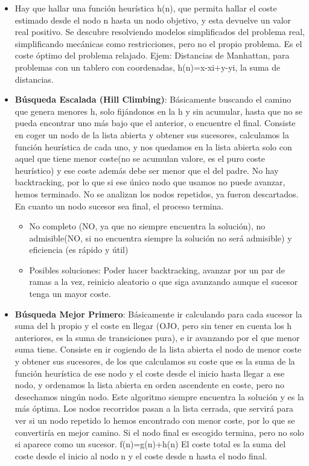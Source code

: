 \documentclass[12pt, twoside, openright]{report} %
\begin{document}
  \begin{itemize}
  \item Hay que hallar una función heurística h(n), que permita hallar el
    coste estimado desde el nodo n hasta un nodo objetivo, y esta
    devuelve un valor real positivo. Se descubre resolviendo modelos
    simplificados del problema real, simplificando mecánicas como
    restricciones, pero no el propio problema. Es el coste óptimo del
    problema relajado. Ejem: Distancias de Manhattan, para problemas con
    un tablero con coordenadas,
    h(n)=\textbar x-xi\textbar+\textbar y-yi\textbar, la suma de
    distancias.
    
  \item \textbf{Búsqueda Escalada (Hill Climbing)}: Básicamente buscando el
    camino que genera menores h, solo fijándonos en la h y sin acumular,
    hasta que no se pueda encontrar uno más bajo que el anterior, o
    encuentre el final. Consiste en coger un nodo de la lista abierta y
    obtener sus sucesores, calculamos la función heurística de cada uno,
    y nos quedamos en la lista abierta solo con aquel que tiene menor
    coste(no se acumulan valore, es el puro coste heurístico) y ese
    coste además debe ser menor que el del padre. No hay backtracking,
    por lo que si ese único nodo que usamos no puede avanzar, hemos
    terminado. No se analizan los nodos repetidos, ya fueron
    descartados. En cuanto un nodo sucesor sea final, el proceso
    termina.
    

    \begin{itemize}
    \item No completo (NO, ya que no siempre encuentra la solución), no
      admisible(NO, si no encuentra siempre la solución no será
      admisible) y eficiencia (es rápido y útil)
      
    \item Posibles soluciones: Poder hacer backtracking, avanzar por un par
      de ramas a la vez, reinicio aleatorio o que siga avanzando aunque
      el sucesor tenga un mayor coste.
      
    \end{itemize}
  \item \textbf{Búsqueda Mejor Primero}: Básicamente ir calculando para cada
    sucesor la suma del h propio y el coste en llegar (OJO, pero sin
    tener en cuenta los h anteriores, es la suma de transiciones pura),
    e ir avanzando por el que menor suma tiene. Consiste en ir cogiendo
    de la lista abierta el nodo de menor coste y obtener sus sucesores,
    de los que calculamos su coste que es la suma de la función
    heurística de ese nodo y el coste desde el inicio hasta llegar a ese
    nodo, y ordenamos la lista abierta en orden ascendente en coste,
    pero no desechamos ningún nodo. Este algoritmo siempre encuentra la
    solución y es la más óptima. Los nodos recorridos pasan a la lista
    cerrada, que servirá para ver si un nodo repetido lo hemos
    encontrado con menor coste, por lo que se convertiría en mejor
    camino. Si el nodo final es escogido termina, pero no solo si
    aparece como un sucesor. f(n)=g(n)+h(n) El coste total es la suma
    del coste desde el inicio al nodo n y el coste desde n hasta el nodo
    final.
    


\end{itemize}
\end{document}
